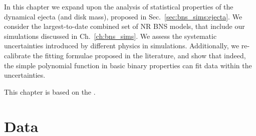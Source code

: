 In this chapter we expand upon the analysis of statistical properties 
of the dynamical ejecta (and disk mass), 
proposed in Sec.~\ref{sec:bns_sims:ejecta}.
We consider the largest-to-date combined set of \ac{NR} \ac{BNS} models, that 
include our simulations discussed in Ch.~\ref{ch:bns_sims}. 
%
We assess the systematic uncertainties introduced by different physics in simulations.
Additionally, we re-calibrate the fitting formulae proposed in the literature, and show that indeed, the simple polynomial function in 
basic binary properties can fit data within the uncertainties.

This chapter is based on the \citet{Nedora:2020qtd}.



\section{Data} 

